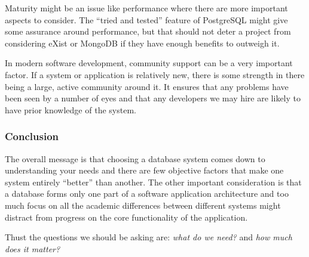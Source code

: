\documentclass[11pt,a4paper]{article}
\begin{document}
Maturity might be an issue like performance where there are more important
aspects to consider. The ``tried and tested'' feature of PostgreSQL might
give some assurance around performance, but that should not deter a
project from considering eXist or MongoDB if they have enough benefits to
outweigh it.

In modern software development, community support can be a very important
factor. If a system or application is relatively new, there is some strength
in there being a large, active community around it. It ensures that
any problems have been seen by a number of eyes and that any developers
we may hire are likely to have prior knowledge of the system.

\subsubsection{Conclusion}

The overall message is that choosing a database system comes down to
understanding your needs and there are few objective factors that
make one system entirely ``better'' than another. The other important
consideration is that a database forms only one part of a software
application architecture and too much focus on all the academic
differences between different systems might distract from progress
on the core functionality of the application.

Thust the questions we should be asking are: \emph{what do we need?}
and \emph{how much does it matter?}



\end{document}
